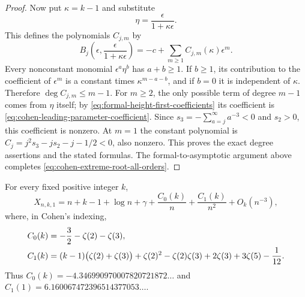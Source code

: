 \begin{proof}
Now put $\kappa=k-1$ and substitute
\begin{equation}\label{eq:two-small-parameter-substitution}
 \eta=\frac{\epsilon}{1+\kappa\epsilon}.
\end{equation}
This defines the polynomials $C_{j,m}$ by
\begin{equation}\label{eq:Cjm-coefficient-recipe}
 B_j\left(\epsilon,\frac{\epsilon}{1+\kappa\epsilon}\right)
       =-c+\sum_{m\geq1}C_{j,m}(\kappa)\epsilon^m.
\end{equation}
Every nonconstant monomial $\epsilon^a\eta^b$ has $a+b\geq1$.
If $b\geq1$, its contribution to the coefficient of $\epsilon^m$
is a constant times $\kappa^{m-a-b}$, and if $b=0$ it is
independent of $\kappa$.  Therefore $\deg C_{j,m}\leq m-1$.
For $m\geq2$, the only possible term of degree $m-1$ comes from
$\eta$ itself; by \eqref{eq:formal-height-first-coefficients} its
coefficient is \eqref{eq:cohen-leading-parameter-coefficient}.
Since $s_3=-\sum_{a=j}^{\infty}a^{-3}<0$ and $s_2>0$, this
coefficient is nonzero.  At $m=1$ the constant polynomial is
$C_j=j^2s_3-js_2-j-1/2<0$, also nonzero.  This proves the exact
degree assertions and the stated formulas.  The formal-to-asymptotic
argument above completes \eqref{eq:cohen-extreme-root-all-orders}.
\end{proof}

\begin{corollary}
\label{cor:cohen-two-constants}
For every fixed positive integer $k$,
\begin{equation}\label{eq:cohen-two-corrections}
 X_{n,k,1}=n+k-1+\log n+\gamma
     +\frac{C_0(k)}n+\frac{C_1(k)}{n^2}+O_k(n^{-3}),
\end{equation}
where, in Cohen's indexing,
\begin{align}\label{eq:cohen-exact-constants}
 C_0(k)&=-\frac32-\zeta(2)-\zeta(3),\\
 C_1(k)&=(k-1)\bigl(\zeta(2)+\zeta(3)\bigr)
       +\zeta(2)^2-\zeta(2)\zeta(3)+2\zeta(3)+3\zeta(5)-\frac1{12}.
       \notag
\end{align}
Thus $C_0(k)=-4.346990970007820721872\ldots$ and
$C_1(1)=6.160067472396514377053\ldots$.
\end{corollary}

